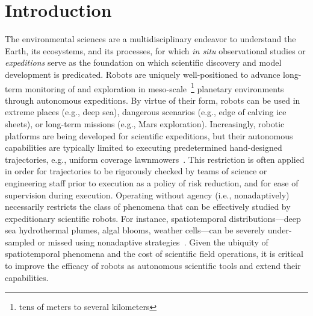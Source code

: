 \chapter{Introduction}


The environmental sciences are a multidisciplinary endeavor to understand the Earth, its ecosystems, and its processes, for which \emph{in situ} observational studies or \emph{expeditions} serve as the foundation on which scientific discovery and model development is predicated.
Robots are uniquely well-positioned to advance long-term monitoring of and exploration in meso-scale~\footnote{tens of meters to several kilometers} planetary environments through autonomous expeditions.
By virtue of their form, robots can be used in extreme places (e.g., deep sea), dangerous scenarios (e.g., edge of calving ice sheets), or long-term missions (e.g., Mars exploration).
Increasingly, robotic platforms are being developed for scientific expeditions, but their autonomous capabilities are typically limited to executing predetermined hand-designed trajectories, e.g., uniform coverage lawnmowers~\autocite{camilli2010tracking}.
This restriction is often applied in order for trajectories to be rigorously checked by teams of science or engineering staff prior to execution as a policy of risk reduction, and for ease of supervision during execution.
Operating without agency (i.e., nonadaptively) necessarily restricts the class of phenomena that can be effectively studied by expeditionary scientific robots.
For instance, spatiotemporal distributions---deep sea hydrothermal plumes, algal blooms, weather cells---can be severely under-sampled or missed using nonadaptive strategies~\autocite{flaspohler2019information}.
Given the ubiquity of spatiotemporal phenomena and the cost of scientific field operations, it is critical to improve the efficacy of robots as autonomous scientific tools and extend their capabilities.

